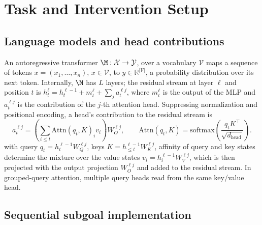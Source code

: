 \section{Task and Intervention Setup}
\label{sec:notations}

\subsection{Language models and head contributions}
\label{sec:notations:lm}
An autoregressive transformer $\M: \mathcal{X} \rightarrow \mathcal{Y}$, over a vocabulary $\mathcal{V}$ maps a sequence of tokens $x=(x_1,\ldots,x_n)$, $x \in \mathcal{V}$, to $y \in \mathbb{R}^{|\mathcal{V}|}$, a probability distribution over its next token. Internally, $\M$ has $L$ layers; the residual stream at layer $\ell$ and position $t$ is
    $h_t^{\ell} = h_t^{\ell-1} + m_t^{\ell} + \sum_{j} a_t^{\ell j}$,
where $m_t^{\ell}$ is the output of the MLP and $a_t^{\ell j}$ is the contribution of the $j$-th attention head. Suppressing normalization and positional encoding, a head's contribution to the residual stream is
\begin{equation}
a_t^{\ell j}=\left(\sum_{i\leq t}\mathrm{Attn}(q_t,K)_i v_i\right)W_O^{\ell j},
\qquad \mathrm{Attn}(q_t,K)=\mathrm{softmax}\!\left(\frac{q_tK^\top}{\sqrt{d_{\mathrm{head}}}}\right).
\label{eq:head}
\end{equation}
with query $q_t = h_t^{\ell-1} W_Q^{\ell j}$, keys $K = h_{\le t}^{\ell-1} W_K^{\ell j}$, affinity of query and key states determine the mixture over the value states $v_i = h_i^{\ell-1} W_V^{\ell j}$, which is then projected with the output projection $W_{O}^{\ell j}$ and added to the residual stream. In grouped-query attention, multiple query heads read from the same key/value head.


\subsection{Sequential subgoal implementation}
\label{sec:notations:task}

